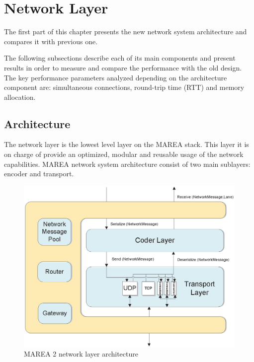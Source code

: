 \chapter{Network Layer}\label{C:NetworkLayer}

The first part of this chapter presents the new network system architecture and compares it with previous one.

The following subsections describe each of its main components and present results in order to measure and compare the performance with the old design. The key performance parameters analyzed depending on the architecture component are: simultaneous connections, round-trip time (RTT) and memory allocation.

\section{Architecture}\label{S:Architecture}

The network layer is the lowest level layer on the MAREA stack. This layer it is on charge of provide an optimized, modular and reusable usage of the network capabilities. MAREA network system architecture consist of two main sublayers: encoder and transport.

\begin{figure}[H]\begin{center}
 \centering
  \captionsetup{justification=centering}
  \includegraphics[scale=0.8]{pictures/network/Network}
  \caption{MAREA 2 network layer architecture \label{fig:network-architecture}}
\end{center}\end{figure}

